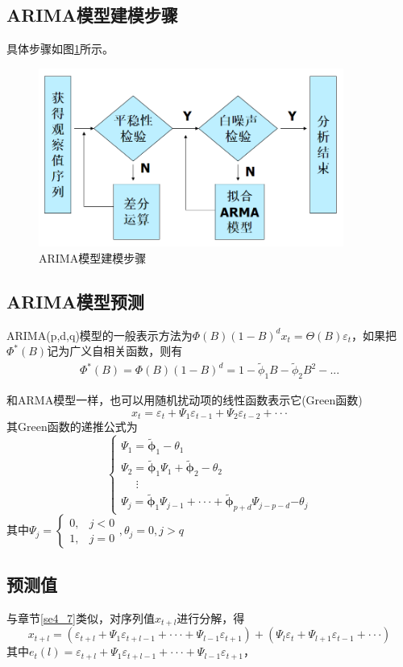 \documentclass[12pt, a4paper, oneside]{ctexbook}
\begin{document}
\subsection{ARIMA模型建模步骤}
具体步骤如图\ref{im5_3}所示。
\begin{figure}[H]
    \centering
    \includegraphics[width = 10cm]{img/5_3.png}
    \caption{ARIMA模型建模步骤}
    \label{im5_3}
\end{figure}

\subsection{ARIMA模型预测}
ARIMA(p,d,q)模型的一般表示方法为$\Phi(B)(1-B)^dx_t=\Theta(B)\varepsilon_t$，如果把$\Phi^*(B)$记为广义自相关函数，则有
$$
\begin{matrix}
    \Phi^{*}(B)=\Phi(B)(1-B)^{d}=1-\tilde{\phi}_{1}B-\tilde{\phi}_{2}B^{2}-...
\end{matrix}
$$

和ARMA模型一样，也可以用随机扰动项的线性函数表示它(Green函数)
$$
x_t=\varepsilon_t+\Psi_1\varepsilon_{t-1}+\Psi_2\varepsilon_{t-2}+\cdotp\cdotp\cdotp 
$$
其Green函数的递推公式为
$$
\begin{cases}
    \Psi_1=\widetilde{\boldsymbol{\phi}}_1-\theta_1\\
    \Psi_2=\widetilde{\boldsymbol{\phi}}_1\Psi_1+\widetilde{\boldsymbol{\phi}}_2-\theta_2\\
     ~~~~~~\vdots\\
    \Psi_j=\widetilde{\boldsymbol{\phi}}_1\Psi_{j-1}+\cdotp\cdotp\cdotp+\widetilde{\boldsymbol{\phi}}_{p+d}\Psi_{j-p-d}\boldsymbol{-}\theta_j
\end{cases}
$$
其中$\Psi_j=
\begin{cases}
    0,&j<0\\
    1,&j=0\end{cases}
    ,\theta_j=0,j>q$

\subsection{预测值}
与章节\ref{se4_7}类似，对序列值$x_{t+l}$进行分解，得
$$
x_{t+l}=(\varepsilon_{t+l}+\Psi_{1}\varepsilon_{t+l-1}+\cdotp\cdotp\cdotp+\Psi_{l-1}\varepsilon_{t+1})+(\Psi_{l}\varepsilon_{t}+\Psi_{l+1}\varepsilon_{t-1}+\cdotp\cdotp\cdotp)
$$
其中$e_t(l)=\varepsilon_{t+l}+\Psi_1\varepsilon_{t+l-1}+\cdotp\cdotp\cdotp+\Psi_{l-1}\varepsilon_{t+1}$，
\end{document}
